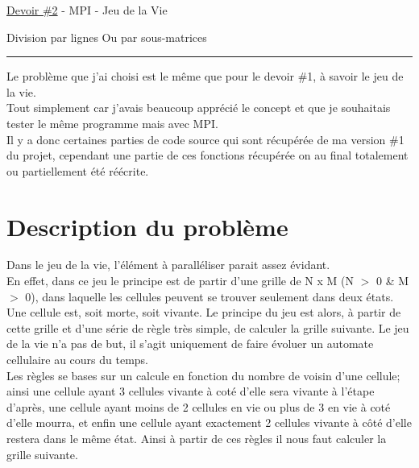 \documentclass[10pt,a4paper]{article}
\begin{document}
\begin{center}
\begin{large}
\underline{Devoir \#2} - MPI - Jeu de la Vie \\
\vspace{0.25cm}
\begin{footnotesize}
Division par lignes Ou par sous-matrices \\
\end{footnotesize}
\noindent\rule{4cm}{0.4pt}
\end{large}
\end{center}



\indent Le problème que j'ai choisi est le même que pour le devoir \#1, à savoir le jeu de la vie.\\
Tout simplement car j'avais beaucoup apprécié le concept et que je souhaitais tester le même programme mais avec MPI.\\

Il y a donc certaines parties de code source qui sont récupérée de ma version \#1 du projet, cependant une partie de ces fonctions récupérée on au final totalement ou partiellement été réécrite.

\section{Description du problème}

Dans le jeu de la vie, l'élément à paralléliser parait assez évidant. \\
En effet, dans ce jeu le principe est de partir d'une grille de N x M (N $>$ 0 \& M $>$ 0), dans laquelle les cellules peuvent se trouver seulement dans deux états. Une cellule est, soit morte, soit vivante. 
Le principe du jeu est alors, à partir de cette grille et d'une série de règle très simple, de calculer la grille suivante. 
Le jeu de la vie n'a pas de but, il s'agit uniquement de faire évoluer un automate cellulaire au cours du temps.\\

Les règles se bases sur un calcule en fonction du nombre de voisin d'une cellule; ainsi une cellule ayant 3 cellules vivante à coté d'elle sera vivante à l'étape d'après, une cellule ayant moins de 2 cellules en vie ou plus de 3 en vie à coté d'elle mourra, et enfin une cellule ayant exactement 2 cellules vivante à côté d'elle restera dans le même état. Ainsi à partir de ces règles il nous faut calculer la grille suivante. \\
\end{document}
